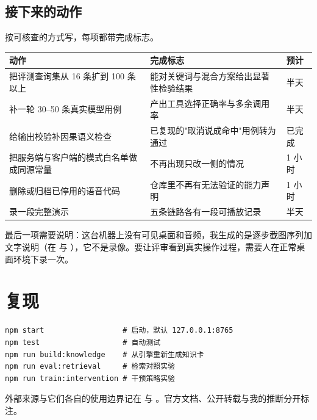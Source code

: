 \subsection{接下来的动作}

按可核查的方式写，每项都带完成标志。

\begin{table}[h]
\centering
\small
\begin{tabular}{L{6.2cm}L{4.2cm}L{2.2cm}}
\toprule
动作 & 完成标志 & 预计 \\
\midrule
把评测查询集从 16 条扩到 100 条以上 & 能对关键词与混合方案给出显著性检验结果 & 半天 \\
补一轮 30--50 条真实模型用例 & 产出工具选择正确率与多余调用率 & 半天 \\
给输出校验补因果语义检查 & 已复现的"取消说成命中"用例转为通过 & 已完成 \\
把服务端与客户端的模式白名单做成同源常量 & 不再出现只改一侧的情况 & 1 小时 \\
删除或归档已停用的语音代码 & 仓库里不再有无法验证的能力声明 & 1 小时 \\
录一段完整演示 & 五条链路各有一段可播放记录 & 半天 \\
\bottomrule
\end{tabular}
\end{table}

最后一项需要说明：这台机器上没有可见桌面和音频，我生成的是逐步截图序列加文字说明（在  与 ），它不是录像。要让评审看到真实操作过程，需要人在正常桌面环境下录一次。

\section{复现}

\begin{verbatim}
npm start                  # 启动，默认 127.0.0.1:8765
npm test                   # 自动测试
npm run build:knowledge    # 从引擎重新生成知识卡
npm run eval:retrieval     # 检索对照实验
npm run train:intervention # 干预策略实验
\end{verbatim}

外部来源与它们各自的使用边界记在  与
。官方文档、公开转载与我的推断分开标注。
